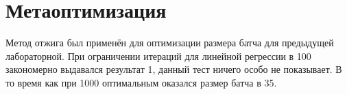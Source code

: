 \documentclass{article}
\begin{document}
\section{Метаоптимизация}
Метод отжига был применён для оптимизации размера батча для предыдущей лабораторной. При ограничении итераций для линейной регрессии в 100 закономерно выдавался результат 1, данный тест ничего особо не показывает. В то время как при 1000 оптимальным оказался размер батча в 35.
\end{document}
